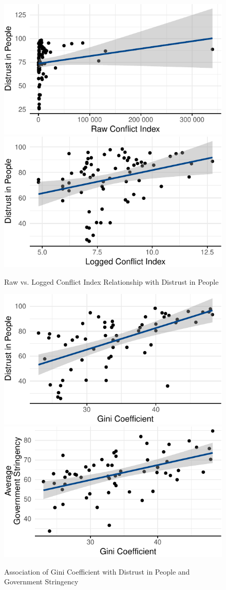 \documentclass[
  11pt,
]{article}
\begin{document}
\begin{figure}
\includegraphics[width=0.48\linewidth]{write_up_test_files/figure-latex/conflict-log-1} \includegraphics[width=0.48\linewidth]{write_up_test_files/figure-latex/conflict-log-2} \caption{Raw vs. Logged Conflict Index Relationship with Distrust in People}\label{fig:conflict-log}
\end{figure}

\begin{figure}
\includegraphics[width=0.48\linewidth]{write_up_test_files/figure-latex/gini-plots-1} \includegraphics[width=0.48\linewidth]{write_up_test_files/figure-latex/gini-plots-2} \caption{Association of Gini Coefficient with Distrust in People and Government Stringency}\label{fig:gini-plots}
\end{figure}
\end{document}
